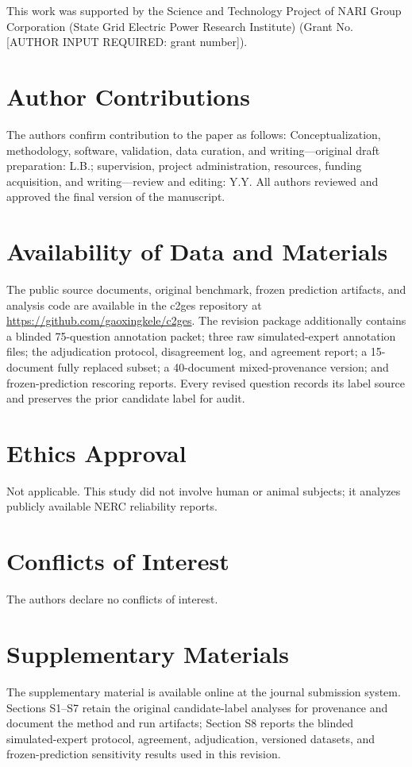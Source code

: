 \documentclass{article}
\begin{document}
This work was supported by the Science and Technology Project of NARI Group Corporation (State Grid Electric Power Research Institute) (Grant No. [AUTHOR INPUT REQUIRED: grant number]).
\section*{Author Contributions}

The authors confirm contribution to the paper as follows: Conceptualization, methodology, software, validation, data curation, and writing---original draft preparation: L.B.; supervision, project administration, resources, funding acquisition, and writing---review and editing: Y.Y. All authors reviewed and approved the final version of the manuscript.
\section*{Availability of Data and Materials}

The public source documents, original benchmark, frozen prediction artifacts, and analysis code are available in the c2ges repository at \url{https://github.com/gaoxingkele/c2ges}. The revision package additionally contains a blinded 75-question annotation packet; three raw simulated-expert annotation files; the adjudication protocol, disagreement log, and agreement report; a 15-document fully replaced subset; a 40-document mixed-provenance version; and frozen-prediction rescoring reports. Every revised question records its label source and preserves the prior candidate label for audit.
\section*{Ethics Approval}

Not applicable. This study did not involve human or animal subjects; it analyzes publicly available NERC reliability reports.
\section*{Conflicts of Interest}

The authors declare no conflicts of interest.
\section*{Supplementary Materials}

The supplementary material is available online at the journal submission system. Sections S1--S7 retain the original candidate-label analyses for provenance and document the method and run artifacts; Section S8 reports the blinded simulated-expert protocol, agreement, adjudication, versioned datasets, and frozen-prediction sensitivity results used in this revision.

\end{document}
